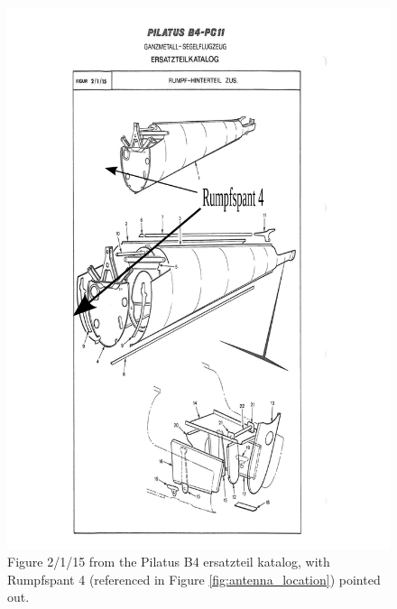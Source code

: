 \documentclass[twoside]{article}
\begin{document}
\begin{figure}
\includegraphics[width=\textwidth,keepaspectratio]{b4_ersatzteil_katalog_fig_2_1_15_annotated}
\caption{Figure 2/1/15 from the Pilatus B4 ersatzteil katalog, with Rumpfspant 4 (referenced in Figure \ref{fig:antenna_location}) pointed out.}
\label{fig:ersatzteil_rumpfspant4}
\end{figure}
\end{document}
